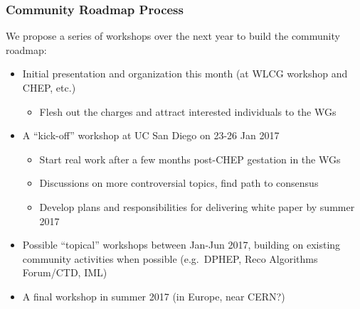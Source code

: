 \begin{frame}
\frametitle{Community Roadmap Process}

We propose a series of workshops over the next year to build the community roadmap:

\begin{itemize}
\item Initial presentation and organization this month (at WLCG workshop and CHEP, etc.)
  \begin{itemize}
  \item Flesh out the charges and attract interested individuals to the WGs
  \end{itemize}
\item A ``kick-off'' workshop at UC San Diego on 23-26 Jan 2017
  \begin{itemize}
  \item Start real work after a few months post-CHEP gestation in the WGs
  \item Discussions on more controversial topics, find path to consensus
  \item Develop plans and responsibilities for delivering white paper by summer 2017
  \end{itemize}
\item Possible ``topical'' workshops between Jan-Jun 2017, building on existing community activities when possible (e.g.\ DPHEP, Reco Algorithms Forum/CTD, IML)
\item A final workshop in summer 2017 (in Europe, near CERN?)
\end{itemize}

\end{frame}


